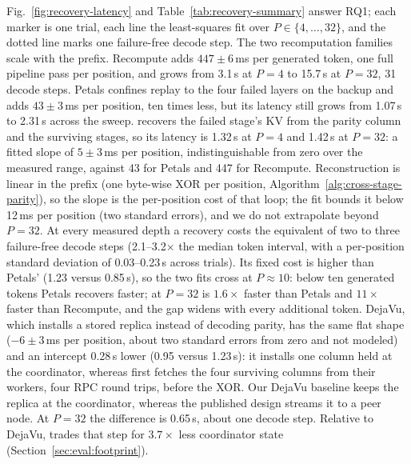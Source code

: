 Fig.~\ref{fig:recovery-latency} and Table~\ref{tab:recovery-summary} answer
RQ1; each marker is one trial, each line the least-squares fit over
$P\in\{4,\dots,32\}$, and the dotted line marks one failure-free decode step.
The two recomputation families scale with the prefix.  Recompute adds
$447\pm6$\,ms per generated token, one full pipeline pass per position, and
grows from 3.1\,s at $P=4$ to 15.7\,s at $P=32$, 31 decode steps.  Petals
confines replay to the four failed layers on the backup and adds
$43\pm3$\,ms per position, ten times less, but its latency still grows from
1.07\,s to 2.31\,s across the sweep.  \sys{} recovers the failed stage's KV
from the parity column and the surviving stages, so its latency is 1.32\,s at
$P=4$ and 1.42\,s at $P=32$: a fitted slope of $5\pm3$\,ms per position,
indistinguishable from zero over the measured range, against 43 for Petals
and 447 for Recompute.  Reconstruction is linear in the prefix (one byte-wise
XOR per position, Algorithm~\ref{alg:cross-stage-parity}), so the slope is
the per-position cost of that loop; the fit bounds it below 12\,ms per
position (two standard errors), and we do not extrapolate beyond $P=32$.
At every measured depth a \sys{} recovery costs the equivalent of two to
three failure-free decode steps (2.1--3.2$\times$ the median token interval,
with a per-position standard deviation of 0.03--0.23\,s across trials).  Its fixed cost
is higher than Petals' (1.23 versus 0.85\,s), so the two fits cross at
$P\approx10$: below ten generated tokens Petals recovers faster; at $P=32$
\sys{} is $1.6\times$ faster than Petals and $11\times$ faster than
Recompute, and the gap widens with every additional token.  DejaVu, which installs a stored
replica instead of decoding parity, has the same flat shape ($-6\pm3$\,ms per
position, about two standard errors from zero and not modeled) and an intercept 0.28\,s lower (0.95 versus 1.23\,s): it installs
one column held at the coordinator, whereas \sys{} first fetches the four
surviving columns from their workers, four RPC round trips, before the XOR.  Our DejaVu baseline keeps the
replica at the coordinator, whereas the published design streams it to a
peer node.
At $P=32$ the difference is 0.65\,s, about one decode step.  Relative to
DejaVu, \sys{} trades that step for $3.7\times$ less coordinator state
(Section~\ref{sec:eval:footprint}).

